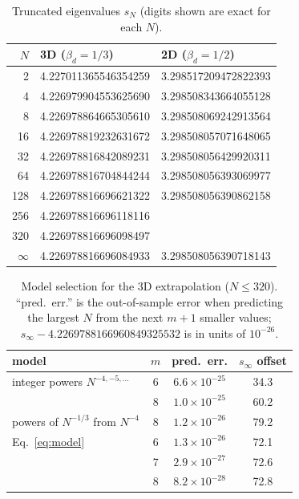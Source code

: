 \documentclass[aps,prd,twocolumn,superscriptaddress,nofootinbib,floatfix]{revtex4-2}
\newcommand{\sinf}{s_\infty}
\newcommand{\bd}{\beta_d}
\begin{document}
\begin{table}
\caption{Truncated eigenvalues $s_N$ (digits shown are exact for each $N$).}
\label{tab:sN}
\begin{ruledtabular}
\begin{tabular}{rll}
$N$ & 3D ($\bd=1/3$) & 2D ($\bd=1/2$)\\ \hline
2   & 4.227011365546354259 & 3.298517209472822393\\
4   & 4.226979904553625690 & 3.298508343664055128\\
8   & 4.226978864665305610 & 3.298508069242913564\\
16  & 4.226978819232631672 & 3.298508057071648065\\
32  & 4.226978816842089231 & 3.298508056429920311\\
64  & 4.226978816704844244 & 3.298508056393069977\\
128 & 4.226978816696621322 & 3.298508056390862158\\
256 & 4.226978816696118116 & \\
320 & 4.226978816696098497 & \\ \hline
$\infty$ & 4.226978816696084933 & 3.298508056390718143
\end{tabular}
\end{ruledtabular}
\end{table}

\begin{table}
\caption{Model selection for the 3D extrapolation ($N\le320$). ``pred.\ err.'' is the out-of-sample error when
predicting the largest $N$ from the next $m+1$ smaller values; $\sinf-4.2269788166960849325532$ is in units of
$10^{-26}$.}
\label{tab:model}
\begin{ruledtabular}
\begin{tabular}{lccc}
model & $m$ & pred.\ err. & $\sinf$ offset \\ \hline
integer powers $N^{-4,-5,\ldots}$ & 6 & $6.6\times10^{-25}$ & 34.3\\
                                   & 8 & $1.0\times10^{-25}$ & 60.2\\
powers of $N^{-1/3}$ from $N^{-4}$  & 8 & $1.2\times10^{-26}$ & 79.2\\
Eq.~\eqref{eq:model}               & 6 & $1.3\times10^{-26}$ & 72.1\\
                                   & 7 & $2.9\times10^{-27}$ & 72.6\\
                                   & 8 & $8.2\times10^{-28}$ & 72.8
\end{tabular}
\end{ruledtabular}
\end{table}
\end{document}
